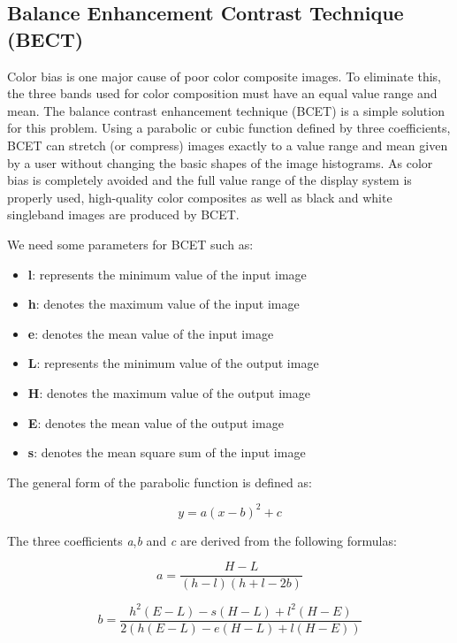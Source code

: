 \vspace{2cm}
\subsection{Balance Enhancement Contrast Technique (BECT)}
Color bias is one major cause of poor color composite images. To eliminate this, the three bands used for color composition must have an equal value range and mean. The balance contrast enhancement technique (BCET) is a simple solution for this problem. Using a parabolic or cubic function defined by three coefficients, BCET can stretch (or compress) images exactly to a value range and mean given by a user without changing the basic shapes of the image histograms. As color bias is completely avoided and the full value range of the display system is properly used, high-quality color composites as well as black and white singleband images are produced by BCET.

We need some parameters for BCET such as:
\begin{itemize}
	\item \textbf{l}: represents the minimum value of the input image
	\item \textbf{h}: denotes the maximum value of the input image
	\item \textbf{e}: denotes the mean value of the input image
	\item \textbf{L}: represents the minimum value of the output image
	\item \textbf{H}: denotes the maximum value of the output image
	\item \textbf{E}: denotes the mean value of the output image
	\item \textbf{s}: denotes the mean square sum of the input image
\end{itemize}

The general form of the parabolic function is defined as:

\begin{equation}
	y = a(x - b)^2 + c
\end{equation}

The three coefficients \textit{a},\textit{b} and \textit{c} are derived from the following formulas:


\begin{equation}
	a = \frac{H-L}{(h-l)(h+l-2b)}
\end{equation}

\begin{equation}
	b = \frac{h^2(E-L)-s(H-L)+l^2(H-E)}{2(h(E-L)-e(H-L)+l(H-E))}
\end{equation}

